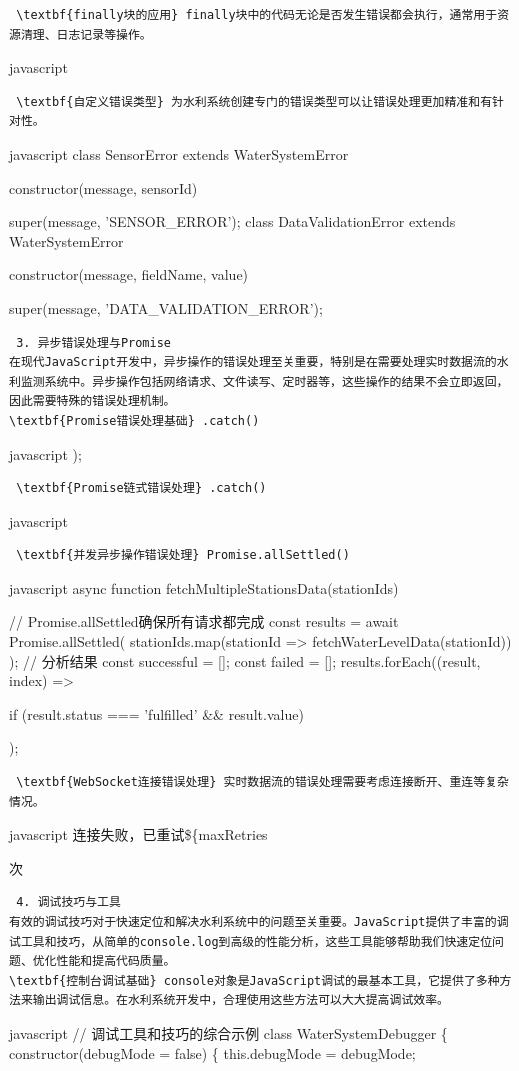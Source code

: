 {{{{{\begin{lstlisting} \textbf{finally块的应用} finally块中的代码无论是否发生错误都会执行，通常用于资源清理、日志记录等操作。 \end{lstlisting}javascript
\begin{lstlisting} \textbf{自定义错误类型} 为水利系统创建专门的错误类型可以让错误处理更加精准和有针对性。 \end{lstlisting}javascript class SensorError extends
WaterSystemError { constructor(message, sensorId) { super(message, 'SENSOR\_ERROR'); class DataValidationError extends
WaterSystemError { constructor(message, fieldName, value) { super(message, 'DATA\_VALIDATION\_ERROR');
\begin{lstlisting} 3. 异步错误处理与Promise
在现代JavaScript开发中，异步操作的错误处理至关重要，特别是在需要处理实时数据流的水利监测系统中。异步操作包括网络请求、文件读写、定时器等，这些操作的结果不会立即返回，因此需要特殊的错误处理机制。
\textbf{Promise错误处理基础} .catch() \end{lstlisting}javascript ); \begin{lstlisting} \textbf{Promise链式错误处理} .catch()
\end{lstlisting}javascript \begin{lstlisting} \textbf{并发异步操作错误处理} Promise.allSettled() \end{lstlisting}javascript async
function fetchMultipleStationsData(stationIds) { // Promise.allSettled确保所有请求都完成 const results = await
Promise.allSettled( stationIds.map(stationId => fetchWaterLevelData(stationId)) ); // 分析结果 const successful = []; const
failed = []; results.forEach((result, index) => { if (result.status === 'fulfilled' \&\& result.value) { );
\begin{lstlisting} \textbf{WebSocket连接错误处理} 实时数据流的错误处理需要考虑连接断开、重连等复杂情况。 \end{lstlisting}javascript
连接失败，已重试\$\{maxRetries}次 \begin{lstlisting} 4. 调试技巧与工具
有效的调试技巧对于快速定位和解决水利系统中的问题至关重要。JavaScript提供了丰富的调试工具和技巧，从简单的console.log到高级的性能分析，这些工具能够帮助我们快速定位问题、优化性能和提高代码质量。
\textbf{控制台调试基础} console对象是JavaScript调试的最基本工具，它提供了多种方法来输出调试信息。在水利系统开发中，合理使用这些方法可以大大提高调试效率。 \end{lstlisting} javascript
// 调试工具和技巧的综合示例 class WaterSystemDebugger \{ constructor(debugMode = false) \{ this.debugMode = debugMode;
}}}}}}}}}}}
